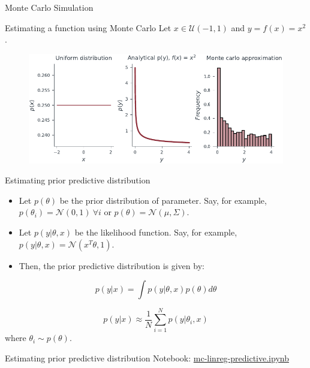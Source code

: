 \documentclass{beamer}
\begin{document}
\begin{section}{Monte Carlo Simulation}
    \begin{frame}{Estimating a function using Monte Carlo}
        Let $x\in \mathcal{U}(-1,1)$ and $y = f(x) = x^2$.
        \begin{figure}
            \centering
        \includegraphics[scale=0.75]{../figures/mc_sampling_ex.pdf}
            \end{figure}    
    \end{frame}

    \begin{frame}{Estimating prior predictive distribution}
        \begin{itemize}
            \item Let $p(\theta)$ be the prior distribution of parameter. Say, for example, $p(\theta_i) = \mathcal{N}(0, 1) ~\forall i$ or $p(\theta) = \mathcal{N}(\mu, \Sigma)$.
            \pause \item Let $p(y |\theta, x)$ be the likelihood function. Say, for example, $p(y|\theta, x) = \mathcal{N}(x^T\theta, 1)$.
            \pause \item Then, the prior predictive distribution is given by:
        \end{itemize}

            \begin{equation}
                p(y|x) = \int p(y|\theta, x) p(\theta) d\theta 
            \end{equation}

            \begin{equation}
                p(y|x) \approx \frac{1}{N} \sum_{i=1}^{N} p(y|\theta_i, x)
            \end{equation}
            where $\theta_i \sim p(\theta)$.
    \end{frame}

    \begin{frame}{Estimating prior predictive distribution}
        Notebook: \url{mc-linreg-predictive.ipynb}
    \end{frame}


\end{section}
\end{document}
